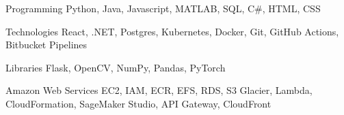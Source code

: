 
\begin{cvskills}
  \cvskill 
    {Programming}
    {Python, Java, Javascript, MATLAB, SQL, C\#, HTML, CSS}

    \cvskill 
    {Technologies}
    {React, .NET, Postgres, Kubernetes, Docker, Git, GitHub Actions, Bitbucket Pipelines}

    \cvskill
    {Libraries}
    {Flask, OpenCV, NumPy, Pandas, PyTorch}

    \cvskill 
    {Amazon Web Services}
    {EC2, IAM, ECR, EFS, RDS, S3 Glacier, Lambda, CloudFormation, SageMaker Studio, API Gateway, CloudFront}

\end{cvskills}
